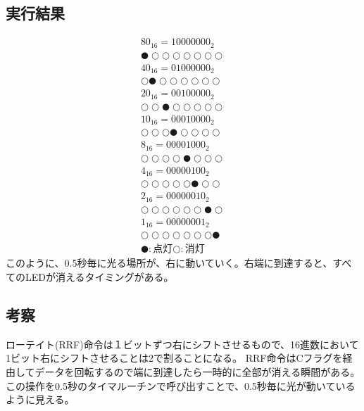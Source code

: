 \documentclass[a4paper,12pt]{ujarticle}
\begin{document}
  \subsection{実行結果}
  \begin{eqnarray*}
   {80}_{16} = 10000000_2 \\
   ●○○○○○○○ \\
   {40}_{16} = 01000000_2 \\
   ○●○○○○○○ \\
   {20}_{16} = 00100000_2 \\
   ○○●○○○○○ \\
   {10}_{16} = 00010000_2 \\
   ○○○●○○○○ \\
   {8}_{16}  = 00001000_2 \\
   ○○○○●○○○ \\
   {4}_{16}  = 00000100_2 \\
   ○○○○○●○○ \\
   {2}_{16}  = 00000010_2 \\
   ○○○○○○●○ \\
   {1}_{16}  = 00000001_2 \\
   ○○○○○○○● \\
   ●:点灯○:消灯
  \end{eqnarray*}
  このように、0.5秒毎に光る場所が、右に動いていく。右端に到達すると、すべてのLEDが消えるタイミングがある。
  \subsection{考察}
  ローテイト(RRF)命令は１ビットずつ右にシフトさせるもので、16進数において1ビット右にシフトさせることは2で割ることになる。
  RRF命令はCフラグを経由してデータを回転するので端に到達したら一時的に全部が消える瞬間がある。
  この操作を0.5秒のタイマルーチンで呼び出すことで、0.5秒毎に光が動いているように見える。\\
\end{document}
